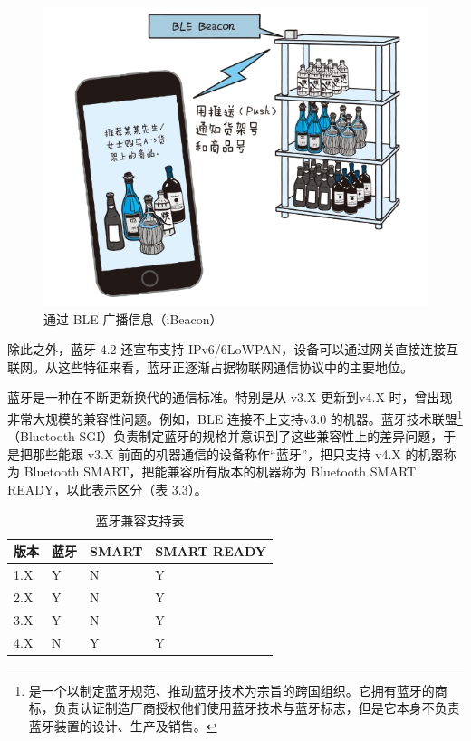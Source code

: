 \documentclass[12pt,UTF8]{ctexbook}
\begin{document}
\begin{figure}[htbp]
	\centering
	\includegraphics[width=1\linewidth]{74}
	\caption{通过 BLE 广播信息（iBeacon）}
	\label{fig:1}
\end{figure}

除此之外，蓝牙 4.2 还宣布支持 IPv6/6LoWPAN，设备可以通过网关直接连接互联网。从这些特征来看，蓝牙正逐渐占据物联网通信协议中的主要地位。

蓝牙是一种在不断更新换代的通信标准。特别是从 v3.X 更新到v4.X 时，曾出现非常大规模的兼容性问题。例如，BLE 连接不上支持v3.0 的机器。蓝牙技术联盟\footnote{是一个以制定蓝牙规范、推动蓝牙技术为宗旨的跨国组织。它拥有蓝牙的商标，负责认证制造厂商授权他们使用蓝牙技术与蓝牙标志，但是它本身不负责蓝牙装置的设计、生产及销售。}（Bluetooth SGI）负责制定蓝牙的规格并意识到了这些兼容性上的差异问题，于是把那些能跟 v3.X 前面的机器通信的设备称作“蓝牙”，把只支持 v4.X 的机器称为 Bluetooth SMART，把能兼容所有版本的机器称为 Bluetooth SMART READY，以此表示区分（表 3.3）。

\begin{table}[!ht] 
	\centering
	\caption{蓝牙兼容支持表}
	\begin{tabular}{|l|l|l|l|}
		\hline
		版本 & 蓝牙 & SMART & SMART READY \\
		\hline
		1.X & Y & N & Y \\
		\hline
		2.X & Y & N & Y \\
		\hline
		3.X & Y & N & Y \\
		\hline
		4.X & N & Y & Y \\
		\hline
	\end{tabular}
\end{table}
\end{document}
